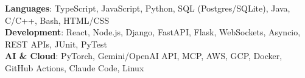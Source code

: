 \begin{itemize}[leftmargin=0.15in, label={}]
    \small{\item{
     \textbf{Languages}{: TypeScript, JavaScript, Python, SQL (Postgres/SQLite), Java, C/C++, Bash, HTML/CSS} \\
     \textbf{Development}{: React, Node.js, Django, FastAPI, Flask, WebSockets, Asyncio, REST APIs, JUnit, PyTest} \\
     \textbf{AI \& Cloud}{: PyTorch, Gemini/OpenAI API, MCP, AWS, GCP, Docker, GitHub Actions, Claude Code, Linux}
    }}
\end{itemize}
